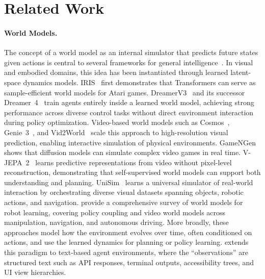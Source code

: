 \section{Related Work}
\label{sec:related}

\paragraph{World Models.}
The concept of a world model as an internal simulator that predicts future states given actions is central to several frameworks for general intelligence~\citep{lecun2022path, hafner2023mastering, yang2026world, delgrange2026foundation}.
In visual and embodied domains, this idea has been instantiated through learned latent-space dynamics models.
IRIS~\citep{micheli2022transformers} first demonstrates that Transformers can serve as sample-efficient world models for Atari games.
DreamerV3~\citep{hafner2023mastering} and its successor Dreamer~4~\citep{hafner2025training} train agents entirely inside a learned world model, achieving strong performance across diverse control tasks without direct environment interaction during policy optimization.
Video-based world models such as Cosmos~\citep{ali2025world}, Genie~3~\citep{genie3}, and Vid2World~\citep{huang2025vid2world} scale this approach to high-resolution visual prediction, enabling interactive simulation of physical environments.
GameNGen~\citep{valevski2025diffusion} shows that diffusion models can simulate complex video games in real time.
V-JEPA~2~\citep{assran2025v} learns predictive representations from video without pixel-level reconstruction, demonstrating that self-supervised world models can support both understanding and planning.
UniSim~\citep{yang2023learning} learns a universal simulator of real-world interaction by orchestrating diverse visual datasets spanning objects, robotic actions, and navigation.
\citet{hou2026world} provide a comprehensive survey of world models for robot learning, covering policy coupling and video world models across manipulation, navigation, and autonomous driving.
More broadly, these approaches model how the environment evolves over time, often conditioned on actions, and use the learned dynamics for planning or policy learning.
\method extends this paradigm to text-based agent environments, where the ``observations'' are structured text such as API responses, terminal outputs, accessibility trees, and UI view hierarchies.

